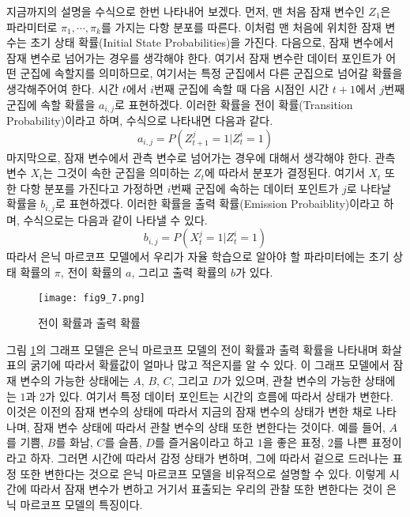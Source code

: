\documentclass[a4paper]{oblivoir}
\begin{document}
지금까지의 설명을 수식으로 한번 나타내어 보겠다. 먼저, 맨 처음 잠재 변수인 $Z_1$은 파라미터로 $\pi_1,\cdots,\pi_k$를 가지는 다항 분포를 따른다. 이처럼 맨 처음에 위치한 잠재 변수는 초기 상태 확률(Initial State Probabilities)을 가진다. 다음으로, 잠재 변수에서 잠재 변수로 넘어가는 경우를 생각해야 한다. 여기서 잠재 변수란 데이터 포인트가 어떤 군집에 속할지를 의미하므로, 여기서는 특정 군집에서 다른 군집으로 넘어갈 확률을 생각해주어여 한다. 시간 $t$에서 $i$번째 군집에 속할 때 다음 시점인 시간 $t+1$에서 $j$번째 군집에 속할 확률을 $a_{i,j}$로 표현하겠다. 이러한 확률을 전이 확률(Transition Probability)이라고 하며, 수식으로 나타내면 다음과 같다. 
\begin{equation}
a_{i,j} = P(Z_{t+1}^j=1|Z_{t}^i=1)
\label{eq:9-1}
\end{equation}
마지막으로, 잠재 변수에서 관측 변수로 넘어가는 경우에 대해서 생각해야 한다. 관측 변수 $X_t$는 그것이 속한 군집을 의미하는 $Z_t$에 따라서 분포가 결정된다. 여기서 $X_t$ 또한 다항 분포를 가진다고 가정하면 $i$번째 군집에 속하는 데이터 포인트가 $j$로 나타날 확률을 $b_{i,j}$로 표현하겠다. 이러한 확률을 출력 확률(Emission Probaiblity)이라고 하며, 수식으로는 다음과 같이 나타낼 수 있다.     
\begin{equation}
b_{i,j} = P(X_{t}^j=1|Z_{t}^i=1)
\label{eq:9-2}
\end{equation}
따라서 은닉 마르코프 모델에서 우리가 자율 학습으로 알아야 할 파라미터에는 초기 상태 확률의 $\pi$, 전이 확률의 $a$, 그리고 출력 확률의 $b$가 있다. \\

\begin{figure}[ht] \centering 
\texttt{[image: fig9\_7.png]} 
\caption{전이 확률과 출력 확률}
\label{fig:9-7}
\end{figure}

그림 \ref{fig:9-7}의 그래프 모델은 은닉 마르코프 모델의 전이 확률과 출력 확률을 나타내며 화살표의 굵기에 따라서 확률값이 얼마나 많고 적은지를 알 수 있다. 이 그래프 모델에서 잠재 변수의 가능한 상태에는 $A$, $B$, $C$, 그리고 $D$가 있으며, 관찰 변수의 가능한 상태에는 $1$과 $2$가 있다. 여기서 특정 데이터 포인트는 시간의 흐름에 따라서 상태가 변한다. 이것은 이전의 잠재 변수의 상태에 따라서 지금의 잠재 변수의 상태가 변한 채로 나타나며, 잠재 변수 상태에 따라서 관찰 변수의 상태 또한 변한다는 것이다. 예를 들어, $A$를 기쁨, $B$를 화남, $C$를 슬픔, $D$를 즐거움이라고 하고 $1$을 좋은 표정, $2$를 나쁜 표정이라고 하자. 그러면 시간에 따라서 감정 상태가 변하며, 그에 따라서 겉으로 드러나는 표정 또한 변한다는 것으로 은닉 마르코프 모델을 비유적으로 설명할 수 있다. 이렇게 시간에 따라서 잠재 변수가 변하고 거기서 표출되는 우리의 관찰 또한 변한다는 것이 은닉 마르코프 모델의 특징이다. \\
\end{document}
